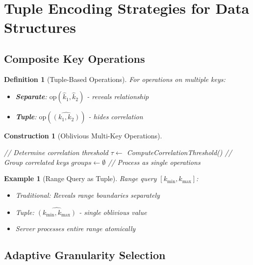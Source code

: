 \documentclass[11pt,final]{article}
\newtheorem{definition}[theorem]{Definition}
\newtheorem{example}[theorem]{Example}
\newtheorem{construction}[theorem]{Construction}
\begin{document}
\section{Tuple Encoding Strategies for Data Structures}

\subsection{Composite Key Operations}

\begin{definition}[Tuple-Based Operations]
For operations on multiple keys:
\begin{itemize}
    \item \textbf{Separate}: $\text{op}(\hat{k}_1, \hat{k}_2)$ - reveals relationship
    \item \textbf{Tuple}: $\text{op}(\widehat{(k_1, k_2)})$ - hides correlation
\end{itemize}
\end{definition}

\begin{construction}[Oblivious Multi-Key Operations]
\begin{algorithm}[H]
\caption{Tuple-Based Batch Operations}
// Determine correlation threshold\;
$\tau \gets$ ComputeCorrelationThreshold()\;
// Group correlated keys\;
$groups \gets \emptyset$\;
// Process as single operations\;
\end{algorithm}
\end{construction}

\begin{example}[Range Query as Tuple]
Range query $[k_{\min}, k_{\max}]$:
\begin{itemize}
    \item Traditional: Reveals range boundaries separately
    \item Tuple: $\widehat{(k_{\min}, k_{\max})}$ - single oblivious value
    \item Server processes entire range atomically
\end{itemize}
\end{example}

\subsection{Adaptive Granularity Selection}
\end{document}
